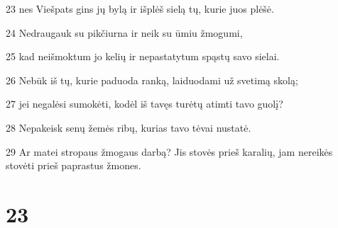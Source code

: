 \par 23 nes Viešpats gins jų bylą ir išplėš sielą tų, kurie juos plėšė. 
\par 24 Nedraugauk su pikčiurna ir neik su ūmiu žmogumi, 
\par 25 kad neišmoktum jo kelių ir nepastatytum spąstų savo sielai. 
\par 26 Nebūk iš tų, kurie paduoda ranką, laiduodami už svetimą skolą; 
\par 27 jei negalėsi sumokėti, kodėl iš tavęs turėtų atimti tavo guolį? 
\par 28 Nepakeisk senų žemės ribų, kurias tavo tėvai nustatė. 
\par 29 Ar matei stropaus žmogaus darbą? Jis stovės prieš karalių, jam nereikės stovėti prieš paprastus žmones.



\chapter{23}


